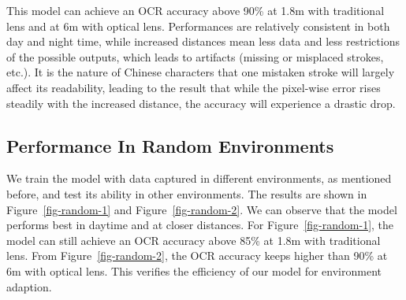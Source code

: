 This model can achieve an OCR accuracy above 90\% at 1.8m with traditional lens and at 6m with optical lens. Performances are relatively consistent in both day and night time, while increased distances mean less data and less restrictions of the possible outputs, which leads to artifacts (missing or misplaced strokes, etc.). It is the nature of Chinese characters that one mistaken stroke will largely affect its readability, leading to the result that while the pixel-wise error rises steadily with the increased distance, the accuracy will experience a drastic drop.

\subsection{Performance In Random Environments}
We train the model with data captured in different environments, as mentioned before, and test its ability in other environments. The results are shown in Figure~\ref{fig-random-1} and Figure~\ref{fig-random-2}. We can observe that the model performs best in daytime and at closer distances. For Figure~\ref{fig-random-1}, the model can still achieve an OCR accuracy above 85\% at 1.8m with traditional lens. From Figure~\ref{fig-random-2}, the OCR accuracy keeps higher than 90\% at 6m with optical lens. This verifies the efficiency of our model for environment adaption.


